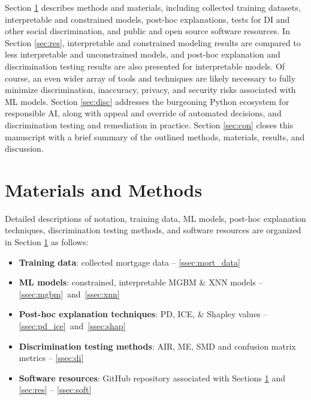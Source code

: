 \documentclass[information,article,submit,moreauthors,pdftex]{definitions/mdpi}
\begin{document}
Section \ref{sec:m_and_m} describes methods and materials, including collected training datasets, interpretable and constrained models, post-hoc explanations, tests for DI and other social discrimination, and public and open source software resources. In Section \ref{sec:res}, interpretable and constrained modeling results are compared to less interpretable and unconstrained models, and post-hoc explanation and discrimination testing results are also presented for interpretable models. Of course, an even wider array of tools and techniques are likely necessary to fully minimize discrimination, inaccuracy, privacy, and security risks associated with ML models. Section \ref{sec:disc} addresses the burgeoning Python ecosystem for responsible AI, along with appeal and override of automated decisions, and discrimination testing and remediation in practice. Section \ref{sec:con} closes this manuscript with a brief summary of the outlined methods, materials, results, and discussion.

\section{Materials and Methods}\label{sec:m_and_m}

Detailed descriptions of notation, training data, ML models, post-hoc explanation techniques, discrimination testing methods, and software resources are organized in Section \ref{sec:m_and_m} as follows:

\begin{itemize}[leftmargin=*,labelsep=5.8mm]
	\item \textbf{Training data}: collected mortgage data -- \textsection\ref{ssec:mort_data}
	\item \textbf{ML models}: constrained, interpretable MGBM \& XNN models  -- \textsection\ref{ssec:mgbm}~and~\textsection\ref{ssec:xnn}
	\item \textbf{Post-hoc explanation techniques}: PD, ICE, \& Shapley values -- \textsection\ref{ssec:pd_ice}~and~\textsection\ref{ssec:shap}
	\item \textbf{Discrimination testing methods}: AIR, ME, SMD and confusion matrix metrics -- \textsection\ref{ssec:di}
	\item \textbf{Software resources}: GitHub repository associated with Sections \ref{sec:m_and_m} and \ref{sec:res} -- \textsection\ref{ssec:soft}
\end{itemize}
\end{document}
